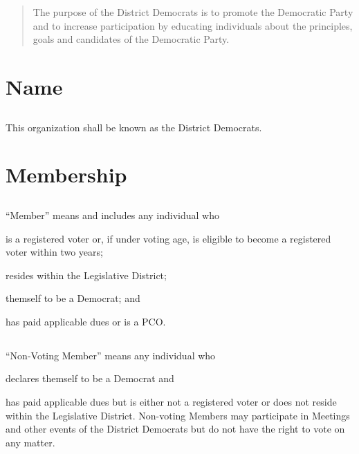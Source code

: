\begin{abstract}
The purpose of the \fortythird{} District Democrats is to promote the Democratic Party and to increase participation by educating individuals about the principles, goals and candidates of the Democratic Party.
\end{abstract}

\section{Name}
\subsection{}
This organization shall be known as the \fortythird{} District Democrats.

\section{Membership}
\subsection{} \label{member}
“Member” means and includes any individual who
\begin{inlinealphalist}
    \item is a registered voter or, if under voting age, is eligible to become a registered voter within two years;
    \item resides within the \fortythird{} Legislative District;
    \item themself to be a Democrat; and
    \item has paid applicable dues or is a PCO.
\end{inlinealphalist}

\subsection{} \label{non-voting-member}
“Non-Voting Member” means any individual who
\begin{inlinealphalist}
    \item declares themself to be a Democrat and
    \item has paid applicable dues but is either not a registered voter or does not reside within the \fortythird{} Legislative District. Non-voting Members may participate in Meetings and other events of the \fortythird{} District Democrats but do not have the right to vote on any matter.
\end{inlinealphalist}

